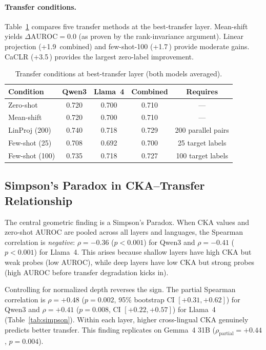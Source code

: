 \documentclass[11pt,a4paper]{article}
\newcommand{\pp}{\,\text{pp}}
\begin{document}
\paragraph{Transfer conditions.}
Table~\ref{tab:transfer_conditions} compares five transfer methods at the best-transfer layer. Mean-shift yields $\Delta\text{AUROC} = 0.0$ (as proven by the rank-invariance argument). Linear projection (+1.9\pp{} combined) and few-shot-100 (+1.7\pp) provide moderate gains. CaCLR (+3.5\pp) provides the largest zero-label improvement.

\begin{table}[t]
\centering
\caption{Transfer conditions at best-transfer layer (both models averaged).}
\label{tab:transfer_conditions}
\small
\begin{tabular}{lcccc}
\toprule
Condition & Qwen3 & Llama~4 & Combined & Requires \\
\midrule
Zero-shot     & 0.720 & 0.700 & 0.710 & --- \\
Mean-shift    & 0.720 & 0.700 & 0.710 & --- \\
LinProj (200) & 0.740 & 0.718 & 0.729 & 200 parallel pairs \\
Few-shot (25) & 0.708 & 0.692 & 0.700 & 25 target labels \\
Few-shot (100)& 0.735 & 0.718 & 0.727 & 100 target labels \\
\bottomrule
\end{tabular}
\end{table}

\subsection{Simpson's Paradox in CKA--Transfer Relationship}
\label{sec:cka}

The central geometric finding is a Simpson's Paradox. When CKA values and zero-shot AUROC are pooled across all layers and languages, the Spearman correlation is \emph{negative}: $\rho = -0.36$ ($p < 0.001$) for Qwen3 and $\rho = -0.41$ ($p < 0.001$) for Llama~4. This arises because shallow layers have high CKA but weak probes (low AUROC), while deep layers have low CKA but strong probes (high AUROC before transfer degradation kicks in).

Controlling for normalized depth reverses the sign. The partial Spearman correlation is $\rho = +0.48$ ($p = 0.002$, 95\% bootstrap CI $[+0.31, +0.62]$) for Qwen3 and $\rho = +0.41$ ($p = 0.008$, CI $[+0.22, +0.57]$) for Llama~4 (Table~\ref{tab:simpson}). Within each layer, higher cross-lingual CKA genuinely predicts better transfer. This finding replicates on Gemma~4 31B ($\rho_{\text{partial}} = +0.44$, $p = 0.004$).
\end{document}

